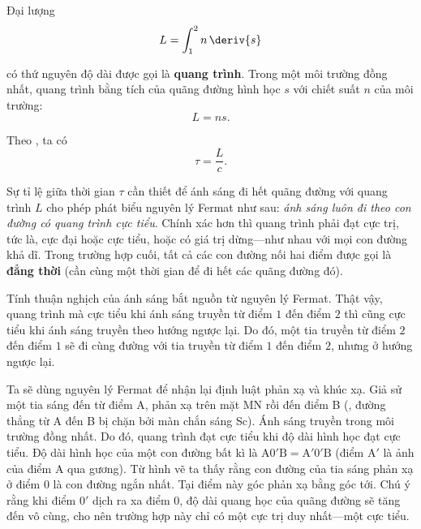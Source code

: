 Đại lượng
\begin{equation}\label{eq:16_52}
    L = \int_1^2 n\, \deriv{s}
\end{equation}

\noindent
có thứ nguyên độ dài được gọi là \textbf{quang trình}.
Trong một môi trường đồng nhất, quang trình bằng tích của quãng đường hình học $s$ với chiết suất $n$ của môi trường:
\begin{equation}\label{eq:16_53}
    L = ns.
\end{equation}

Theo , ta có
\begin{equation}\label{eq:16_54}
    \tau = \frac{L}{c}.
\end{equation}

\noindent
Sự tỉ lệ giữa thời gian $\tau$ cần thiết để ánh sáng đi hết quãng đường với quang trình $L$ cho phép phát biểu nguyên lý Fermat như sau: \textit{ánh sáng luôn đi theo con đường có quang trình cực tiểu}.
Chính xác hơn thì quang trình phải đạt cực trị, tức là, cực đại hoặc cực tiểu, hoặc có giá trị dừng---như nhau với mọi con đường khả dĩ.
Trong trường hợp cuối, tất cả các con đường nối hai điểm được gọi là \textbf{đẳng thời} (cần cùng một thời gian để đi hết các quãng đường đó).

Tính thuận nghịch của ánh sáng bắt nguồn từ nguyên lý Fermat.
Thật vậy, quang trình mà cực tiểu khi ánh sáng truyền từ điểm $1$ đến điểm $2$ thì cũng cực tiểu khi ánh sáng truyền theo hướng ngược lại.
Do đó, một tia truyền từ điểm $2$ đến điểm $1$ sẽ đi cùng đường với tia truyền từ điểm $1$ đến điểm $2$, nhưng ở hướng ngược lại.

Ta sẽ dùng nguyên lý Fermat để nhận lại định luật phản xạ và khúc xạ.
Giả sử một tia sáng đến từ điểm A, phản xạ trên mặt MN rồi đến điểm B (, đường thẳng từ A đến B bị chặn bởi màn chắn sáng Sc).
Ánh sáng truyền trong môi trường đồng nhất.
Do đó, quang trình đạt cực tiểu khi độ dài hình học đạt cực tiểu.
Độ dài hình học của một con đường bất kì là $\text{A}0'\text{B}=\text{A}'0'\text{B}$ (điểm A$'$ là ảnh của điểm A qua gương).
Từ hình vẽ ta thấy rằng con đường của tia sáng phản xạ ở điểm $0$ là con đường ngắn nhất.
Tại điểm này góc phản xạ bằng góc tới.
Chú ý rằng khi điểm $0'$ dịch ra xa điểm $0$, độ dài quang học của quãng đường sẽ tăng đến vô cùng, cho nên trường hợp này chỉ có một cực trị duy nhất---một cực tiểu.


